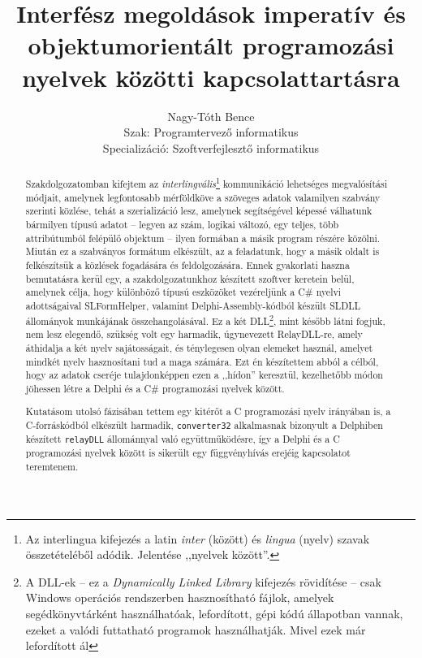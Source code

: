 \documentclass[tocnopagenum]{thesis-ekf}
\begin{document}
	\title{Interfész megoldások imperatív és objektumorientált programozási nyelvek közötti kapcsolattartásra}
	\author{Nagy-Tóth Bence\\Szak: Programtervező informatikus\\Specializáció: Szoftverfejlesztő informatikus}
	\date{\the\year{}}
	\VerbatimFootnotes
	\maketitle
	\tableofcontents
	\begin{abstract}
		Szakdolgozatomban kifejtem az \textit{interlingvális}\footnote{Az interlingua kifejezés a latin \textit{inter} (között) és \textit{lingua} (nyelv) szavak összetételéből adódik. Jelentése ,,nyelvek között''.} kommunikáció lehetséges megvalósítási módjait, amelynek legfontosabb mérföldköve a szöveges adatok valamilyen szabvány szerinti közlése, tehát a szerializáció lesz, amelynek segítségével képessé válhatunk bármilyen típusú adatot -- legyen az szám, logikai változó, egy teljes, több attribútumból felépülő objektum -- ilyen formában a másik program részére közölni. Miután ez a szabványos formátum elkészült, az a feladatunk, hogy a másik oldalt is felkészítsük a közlések fogadására és feldolgozására. Ennek gyakorlati haszna bemutatásra kerül egy, a szakdolgozatunkhoz készített szoftver keretein belül, amelynek célja, hogy különböző típusú eszközöket vezéreljünk a C\# nyelvi adottságaival SLFormHelper, valamint Delphi-Assembly-kódból készült SLDLL állományok munkájának összehangolásával. Ez a két DLL\footnote{A DLL-ek -- ez a \textit{Dynamically Linked Library} kifejezés rövidítése -- csak Windows operációs rendszerben hasznosítható fájlok, amelyek segédkönyvtárként használhatóak, lefordított, gépi kódú állapotban vannak, ezeket a valódi futtatható programok használhatják. Mivel ezek már lefordított ál}, mint később látni fogjuk, nem lesz elegendő, szükség volt egy harmadik, úgynevezett RelayDLL-re, amely áthidalja a két nyelv sajátosságait, és ténylegesen olyan elemeket használ, amelyet mindkét nyelv hasznosítani tud a maga számára. Ezt én készítettem abból a célból, hogy az adatok cseréje tulajdonképpen ezen a ,,hídon'' keresztül, kezelhetőbb módon jöhessen létre a Delphi és a C\# programozási nyelvek között. 
		
		Kutatásom utolsó fázisában tettem egy kitérőt a C programozási nyelv irányában is, a C-forráskódból elkészült harmadik, \verb*|converter32| alkalmasnak bizonyult a Delphiben készített \verb*|relayDLL| állománnyal való együttműködésre, így a Delphi és a C programozási nyelvek között is sikerült egy függvényhívás erejéig kapcsolatot teremtenem.
		

\end{abstract}
\end{document}
